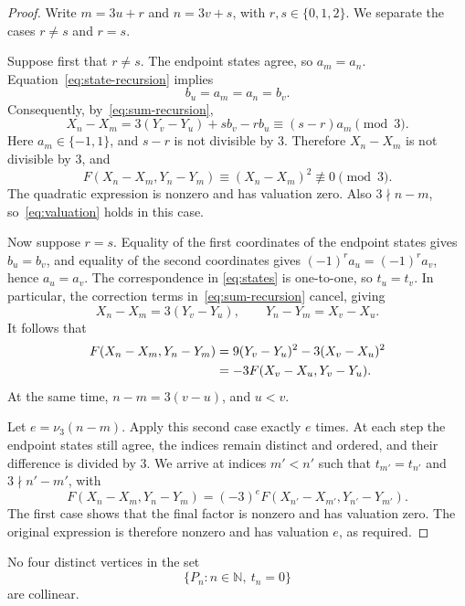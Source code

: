 \documentclass[12pt,reqno]{article}
\newcommand{\N}{\mathbb N}
\begin{document}
\begin{proof}
Write $m=3u+r$ and $n=3v+s$, with $r,s\in\{0,1,2\}$. We separate
the cases $r\ne s$ and $r=s$.

Suppose first that $r\ne s$. The endpoint states agree, so
$a_m=a_n$. Equation~\eqref{eq:state-recursion} implies
\[
  b_u=a_m=a_n=b_v.
\]
Consequently, by~\eqref{eq:sum-recursion},
\[
  X_n-X_m
  =3(Y_v-Y_u)+s b_v-r b_u
  \equiv(s-r)a_m\pmod3.
\]
Here $a_m\in\{-1,1\}$, and $s-r$ is not divisible by $3$.
Therefore $X_n-X_m$ is not divisible by $3$, and
\[
  F(X_n-X_m,Y_n-Y_m)\equiv(X_n-X_m)^2\not\equiv0\pmod3.
\]
The quadratic expression is nonzero and has valuation zero. Also
$3\nmid n-m$, so~\eqref{eq:valuation} holds in this case.

Now suppose $r=s$. Equality of the first coordinates of the endpoint
states gives $b_u=b_v$, and equality of the second coordinates gives
$(-1)^r a_u=(-1)^r a_v$, hence $a_u=a_v$. The correspondence in
\eqref{eq:states} is one-to-one, so $t_u=t_v$. In particular, the
correction terms in~\eqref{eq:sum-recursion} cancel, giving
\[
  X_n-X_m=3(Y_v-Y_u),\qquad
  Y_n-Y_m=X_v-X_u.
\]
It follows that
\begin{align}
 F(X_n-X_m,Y_n-Y_m)
 &=9(Y_v-Y_u)^2-3(X_v-X_u)^2\notag\\
 &=-3F(X_v-X_u,Y_v-Y_u).\label{eq:descent}
\end{align}
At the same time, $n-m=3(v-u)$, and $u<v$.

Let $e=\nu_3(n-m)$. Apply this second case exactly $e$ times. At each
step the endpoint states still agree, the indices remain distinct and
ordered, and their difference is divided by $3$. We arrive at indices
$m'<n'$ such that $t_{m'}=t_{n'}$ and $3\nmid n'-m'$, with
\[
  F(X_n-X_m,Y_n-Y_m)
  =(-3)^e F(X_{n'}-X_{m'},Y_{n'}-Y_{m'}).
\]
The first case shows that the final factor is nonzero and has valuation
zero. The original expression is therefore nonzero and has valuation
$e$, as required.
\end{proof}

\begin{proposition}\label{prop:no-four}
No four distinct vertices in the set
\[
  \{P_n:n\in\N,\ t_n=0\}
\]
are collinear.
\end{proposition}
\end{document}
